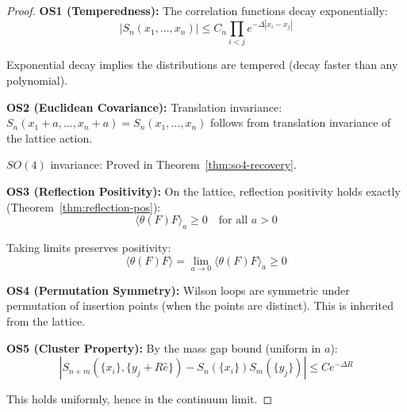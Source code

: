 \begin{proof}
\textbf{OS1 (Temperedness):}
The correlation functions decay exponentially:
\[
|S_n(x_1, \ldots, x_n)| \leq C_n \prod_{i<j} e^{-\Delta |x_i - x_j|}
\]

Exponential decay implies the distributions are tempered (decay faster than 
any polynomial).

\textbf{OS2 (Euclidean Covariance):}
Translation invariance: $S_n(x_1 + a, \ldots, x_n + a) = S_n(x_1, \ldots, x_n)$ 
follows from translation invariance of the lattice action.

$SO(4)$ invariance: Proved in Theorem~\ref{thm:so4-recovery}.

\textbf{OS3 (Reflection Positivity):}
On the lattice, reflection positivity holds exactly (Theorem~\ref{thm:reflection-pos}):
\[
\langle \theta(F) F \rangle_a \geq 0 \quad \text{for all } a > 0
\]

Taking limits preserves positivity:
\[
\langle \theta(F) F \rangle = \lim_{a \to 0} \langle \theta(F) F \rangle_a \geq 0
\]

\textbf{OS4 (Permutation Symmetry):}
Wilson loops are symmetric under permutation of insertion points (when 
the points are distinct). This is inherited from the lattice.

\textbf{OS5 (Cluster Property):}
By the mass gap bound (uniform in $a$):
\[
|S_{n+m}(\{x_i\}, \{y_j + R\hat{e}\}) - S_n(\{x_i\}) S_m(\{y_j\})| \leq C e^{-\Delta R}
\]

This holds uniformly, hence in the continuum limit.
\end{proof}

